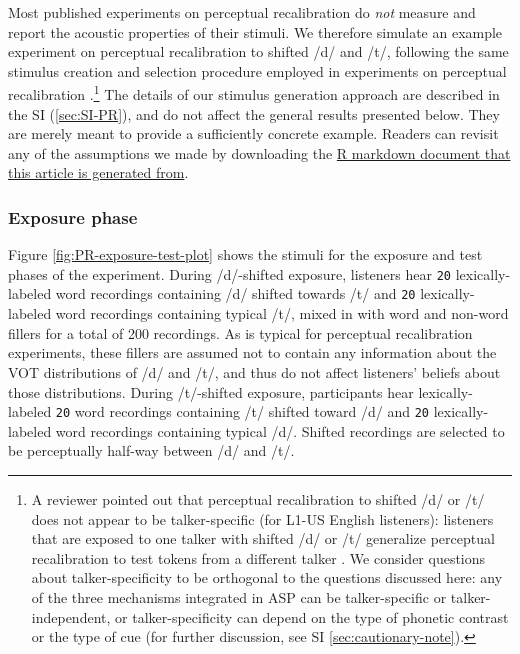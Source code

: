 \documentclass[
  11pt,
  man,floatsintext]{apa6}
\begin{document}
Most published experiments on perceptual recalibration do \emph{not} measure and report the acoustic properties of their stimuli. We therefore simulate an example experiment on perceptual recalibration to shifted /d/ and /t/, following the same stimulus creation and selection procedure employed in experiments on perceptual recalibration \autocite[e.g.,][]{kraljic-samuel2006}.\footnote{A reviewer pointed out that perceptual recalibration to shifted /d/ or /t/ does not appear to be talker-specific (for L1-US English listeners): listeners that are exposed to one talker with shifted /d/ or /t/ generalize perceptual recalibration to test tokens from a different talker \autocite[unlike for shifted /s/ or //, e.g.,][]{kraljic-samuel2007}. We consider questions about talker-specificity to be orthogonal to the questions discussed here: any of the three mechanisms integrated in ASP can be talker-specific or talker-independent, or talker-specificity can depend on the type of phonetic contrast or the type of cue (for further discussion, see SI \ref{sec:cautionary-note}).} The details of our stimulus generation approach are described in the SI (\ref{sec:SI-PR}), and do not affect the general results presented below. They are merely meant to provide a sufficiently concrete example. Readers can revisit any of the assumptions we made by downloading the \href{https://osf.io/q7gjp/}{R markdown document that this article is generated from}.

\subsubsection{Exposure phase}\label{exposure-phase}

Figure \ref{fig:PR-exposure-test-plot} shows the stimuli for the exposure and test phases of the experiment. During /d/-shifted exposure, listeners hear \texttt{20} lexically-labeled word recordings containing /d/ shifted towards /t/ and \texttt{20} lexically-labeled word recordings containing typical /t/, mixed in with word and non-word fillers for a total of 200 recordings. As is typical for perceptual recalibration experiments, these fillers are assumed not to contain any information about the VOT distributions of /d/ and /t/, and thus do not affect listeners' beliefs about those distributions. During /t/-shifted exposure, participants hear lexically-labeled \texttt{20} word recordings containing /t/ shifted toward /d/ and \texttt{20} lexically-labeled word recordings containing typical /d/. Shifted recordings are selected to be perceptually half-way between /d/ and /t/.
\end{document}
